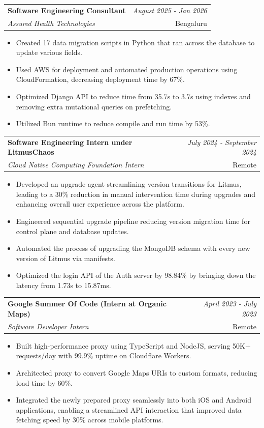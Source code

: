 \documentclass[a4paper,11pt]{article}
\makeatletter
\newcommand{\resumeSubheading}[4]{
\vspace{0.5mm}\item
    \begin{tabular*}{0.98\textwidth}[t]{l@{\extracolsep{\fill}}r}
        \textbf{#1} & \textit{\footnotesize{#4}} \\
        \textit{\footnotesize{#3}} &  \footnotesize{#2}\\
    \end{tabular*}
    \vspace{-2.4mm}
}
\newcommand{\resumeItemListStart}{\begin{justify}\begin{itemize}[leftmargin=3ex, rightmargin=2ex, noitemsep,labelsep=1.2mm,itemsep=0mm]\small}
\newcommand{\resumeItemListEnd}{\end{itemize}\end{justify}\vspace{-2mm}}
\makeatother
\begin{document}
\vspace{-2mm}
\resumeSubheading
{ Software Engineering Consultant}{Bengaluru}
{Assured Health Technologies}{August 2025 - Jan 2026}
\resumeItemListStart
\item {Created 17 data migration scripts in Python that ran across the database to update various fields.}
\item {Used AWS for deployment and automated production operations using CloudFormation, decreasing deployment time by 67\%.}
\item {Optimized Django API to reduce time from 35.7s to 3.7s using indexes and removing extra mutational queries on prefetching.}
\item {Utilized Bun runtime to reduce compile and run time by 53\%.}
\resumeItemListEnd

\vspace{-2mm}
\resumeSubheading
{ Software Engineering Intern under LitmusChaos}{Remote}
{Cloud Native Computing Foundation Intern}{July 2024 - September 2024}
\resumeItemListStart
\item {Developed an upgrade agent streamlining version transitions for Litmus, leading to a 30\% reduction in manual intervention time during upgrades and enhancing overall user experience across the platform.}
\item {Engineered sequential upgrade pipeline reducing version migration time for control plane and database updates.}
\item {Automated the process of upgrading the MongoDB schema with every new version of Litmus via manifests.}
\item {Optimized the login API of the Auth server by 98.84\% by bringing down the latency from 1.73s to 15.87ms.}
\resumeItemListEnd


\vspace{-2.0mm}

\resumeSubheading
{ Google Summer Of Code (Intern at Organic Maps)}{Remote}
{Software Developer Intern}{April 2023 - July 2023}
\resumeItemListStart
\item {Built high-performance proxy using TypeScript and NodeJS, serving 50K+ requests/day with 99.9\% uptime on Cloudflare Workers.}
\item {Architected proxy to convert Google Maps URIs to custom formats, reducing load time by 60\%.}
\item {Integrated the newly prepared proxy seamlessly into both iOS and Android applications, enabling a streamlined API interaction that improved data fetching speed by 30\% across mobile platforms.}
\resumeItemListEnd
    
\end{document}
